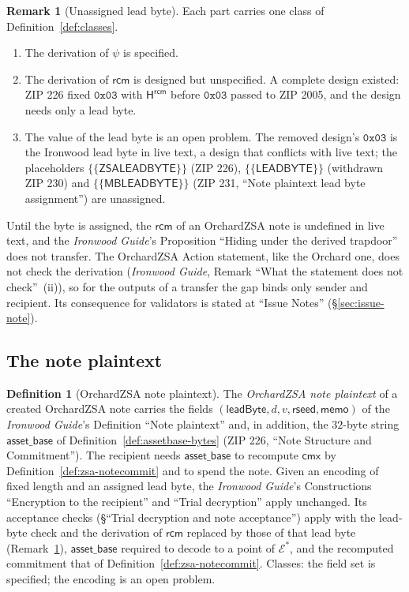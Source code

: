 \documentclass[11pt,a4paper]{article}
\theoremstyle{definition}
\newtheorem{definition}[theorem]{Definition}
\newtheorem{remark}[theorem]{Remark}
\newcommand{\cmx}{\mathsf{cmx}}
\newcommand{\Ep}{\ensuremath{\mathcal{E}}}
\newcommand{\rcm}{\ensuremath{\mathsf{rcm}}}
\begin{document}
\begin{remark}[Unassigned lead byte]\label{rem:leadbyte-open}
Each part carries one class of Definition~\ref{def:classes}.
\begin{enumerate}[label=(\roman*)]
\item The derivation of $\psi$ is specified.
\item The derivation of $\rcm$ is designed but unspecified. A complete
  design existed: ZIP 226 fixed $\mathtt{0x03}$ with $\mathsf{H}^{\mathsf{rcm}}$
  before $\mathtt{0x03}$ passed to ZIP 2005, and the design needs only a
  lead byte.
\item The value of the lead byte is an open problem. The removed design's
  $\mathtt{0x03}$ is the Ironwood lead byte in live text, a design that
  conflicts with live text; the placeholders
  $\{\{\mathsf{ZSALEADBYTE}\}\}$ (ZIP 226), $\{\{\mathsf{LEADBYTE}\}\}$
  (withdrawn ZIP 230) and $\{\{\mathsf{MBLEADBYTE}\}\}$ (ZIP 231, ``Note
  plaintext lead byte assignment'') are unassigned.
\end{enumerate}
Until the byte is assigned, the $\rcm$ of an OrchardZSA note is undefined in
live text, and the \emph{Ironwood Guide}'s Proposition ``Hiding under the
derived trapdoor'' does not transfer. The OrchardZSA Action statement, like
the Orchard one, does not check the derivation (\emph{Ironwood Guide},
Remark ``What the statement does not check''~(ii)), so for the outputs of a
transfer the gap binds only sender and recipient. Its consequence for
validators is stated at ``Issue Notes'' (\S\ref{sec:issue-note}).
\end{remark}

\subsection{The note plaintext}\label{sec:notes-plaintext}

\begin{definition}[OrchardZSA note plaintext]\label{def:zsa-plaintext}
The \emph{OrchardZSA note plaintext} of a created OrchardZSA note carries
the fields $(\mathsf{leadByte}, d, v, \mathsf{rseed}, \mathsf{memo})$ of the
\emph{Ironwood Guide}'s Definition ``Note plaintext'' and, in addition, the
$32$-byte string $\mathsf{asset\_base}$ of
Definition~\ref{def:assetbase-bytes} (ZIP 226, ``Note Structure and
Commitment''). The recipient needs $\mathsf{asset\_base}$ to recompute
$\cmx$ by Definition~\ref{def:zsa-notecommit} and to spend the note. Given
an encoding of fixed length and an assigned lead byte, the \emph{Ironwood
Guide}'s Constructions ``Encryption to the recipient'' and ``Trial
decryption'' apply unchanged. Its acceptance checks (\S``Trial decryption
and note acceptance'') apply with the lead-byte check and the derivation of
$\rcm$ replaced by those of that lead byte
(Remark~\ref{rem:leadbyte-open}), $\mathsf{asset\_base}$ required to decode
to a point of $\Ep^{*}$, and the recomputed commitment that of
Definition~\ref{def:zsa-notecommit}. Classes: the field set is
specified; the encoding is an open problem.
\end{definition}
\end{document}
